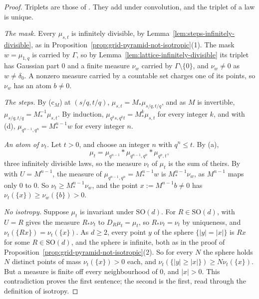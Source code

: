 \begin{proof}
Triplets are those of . They add under convolution, and the triplet of a law is unique.

\emph{The mask.} Every $\mu_{s,t}$ is infinitely divisible, by
Lemma~\ref{lem:steps-infinitely-divisible}, as in Proposition~\ref{prop:grid-pyramid-not-isotropic}(1).
The mask $w = \mu_{1,q}$ is carried by $\Gamma$, so by Lemma~\ref{lem:lattice-infinitely-divisible}
its triplet has Gaussian part $0$ and a finite \Levy{} measure $\nu_w$ carried by
$\Gamma \setminus \{0\}$, and $\nu_w \ne 0$ as $w \ne \delta_0$. A nonzero measure carried by a
countable set charges one of its points, so $\nu_w$ has an atom $b \ne 0$.

\emph{The steps.} By (c$_M$) at $(s/q, t/q)$, $\mu_{s,t} = M_*\mu_{s/q,t/q}$, and as $M$ is
invertible, $\mu_{s/q,t/q} = M^{-1}_*\mu_{s,t}$. By induction,
$\mu_{q^ks,q^kt} = M^k_*\mu_{s,t}$ for every integer $k$, and with (d),
$\mu_{q^{n-1},q^n} = M^{n-1}_*w$ for every integer $n$.

\emph{An atom of $\nu_t$.} Let $t > 0$, and choose an integer $n$ with $q^n \le t$. By (a),
\[
\mu_t = \mu_{q^{n-1}} * \mu_{q^{n-1},q^n} * \mu_{q^n,t} ,
\]
three infinitely divisible laws, so the \Levy{} measure $\nu_t$ of $\mu_t$ is the sum of theirs. By
 with $U = M^{n-1}$, the \Levy{} measure of $\mu_{q^{n-1},q^n} = M^{n-1}_*w$ is
$M^{n-1}_*\nu_w$, as $M^{n-1}$ maps only $0$ to $0$. So $\nu_t \ge M^{n-1}_*\nu_w$, and the point
$x := M^{n-1}b \ne 0$ has $\nu_t(\{x\}) \ge \nu_w(\{b\}) > 0$.

\emph{No isotropy.} Suppose $\mu_t$ is invariant under $\mathrm{SO}(d)$. For
$R \in \mathrm{SO}(d)$,  with $U = R$ gives the \Levy{} measure $R_*\nu_t$ to
$D_R\mu_t = \mu_t$, so $R_*\nu_t = \nu_t$ by uniqueness, and $\nu_t(\{Rx\}) = \nu_t(\{x\})$. As
$d \ge 2$, every point $y$ of the sphere $\{|y| = |x|\}$ is $Rx$ for some $R \in \mathrm{SO}(d)$, and
the sphere is infinite, both as in the proof of Proposition~\ref{prop:grid-pyramid-not-isotropic}(2).
So for every $N$ the sphere holds $N$ distinct points of mass $\nu_t(\{x\}) > 0$ each, and
$\nu_t(\{|y| \ge |x|\}) \ge N\nu_t(\{x\})$. But a \Levy{} measure is finite off every
neighbourhood of $0$, and $|x| > 0$. This contradiction proves the first sentence; the second is the
first, read through the definition of isotropy.


\end{proof}
